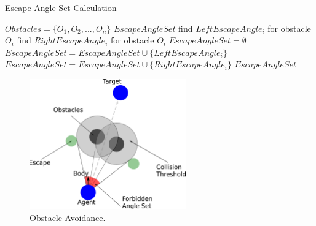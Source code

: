 \begin{algorithm}[t!]
\caption{Escape Angle Set Calculation}
\label{AngleSet}
\begin{algorithmic}[1]
$Obstacles = \lbrace O_{1},O_{2},...,O_{n} \rbrace $
$EscapeAngleSet$
\STATE
{}
\STATE find $LeftEscapeAngle_i$ for obstacle $O_i$
\STATE find $RightEscapeAngle_i$ for obstacle $O_i$
\ENDFOR
\STATE $EscapeAngleSet = \emptyset$
\STATE $EscapeAngleSet = EscapeAngleSet \cup \{LeftEscapeAngle_i\}$
\ENDIF
{}
\STATE $EscapeAngleSet = EscapeAngleSet \cup \{RightEscapeAngle_i\}$
\ENDIF
\ENDFOR
\RETURN $EscapeAngleSet$
\end{algorithmic}
\end{algorithm}



 \begin{figure}[t!]
  \centering
  \includegraphics[width=0.6\textwidth]{Chapter3/figures/ObstacleAvoidance.pdf}
  \caption{Obstacle Avoidance.}
  \label{fig:ObstacleAvoidance}
\end{figure} 


